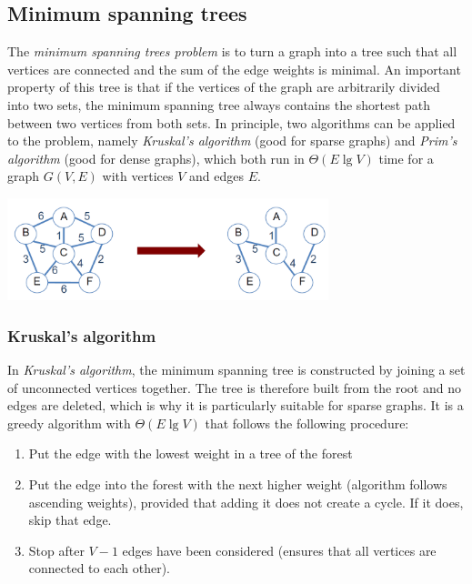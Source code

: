 %

\subsection{Minimum spanning trees}

The \emph{minimum spanning trees problem} is to turn a graph into a tree such that all vertices are connected and the sum of the edge weights is minimal. An important property of this tree is that if the vertices of the graph are arbitrarily divided into two sets, the minimum spanning tree always contains the shortest path between two vertices from both sets. In principle, two algorithms can be applied to the problem, namely \emph{Kruskal's algorithm} (good for sparse graphs) and \emph{Prim's algorithm} (good for dense graphs), which both run in $\Theta(E\lg V)$ time for a graph $G(V,E)$ with vertices $V$ and edges $E$.

\begin{center}\includegraphics[width=0.70\textwidth]{img/graphs/MinimumSpanningTree.png}\end{center}

\subsubsection{Kruskal's algorithm}

In \emph{Kruskal's algorithm}, the minimum spanning tree is constructed by joining a set of unconnected vertices together. The tree is therefore built from the root and no edges are deleted, which is why it is particularly suitable for sparse graphs. It is a greedy algorithm with $\Theta(E\lg V)$ that follows the following procedure:

\begin{enumerate}
    \item Put the edge with the lowest weight in a tree of the forest
    \item Put the edge into the forest with the next higher weight (algorithm follows ascending weights), provided that adding it does not create a cycle. If it does, skip that edge.
    \item Stop after $V-1$ edges have been considered (ensures that all vertices are connected to each other). 
\end{enumerate}

